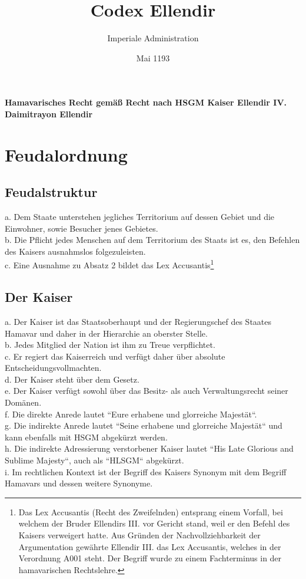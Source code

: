\documentclass{article}
\title{Codex Ellendir}
\author{Imperiale Administration}
\date{Mai 1193}
\begin{document}
\maketitle
\vspace*{\fill}
\paragraph{Hamavarisches Recht gemäß Recht nach HSGM Kaiser Ellendir IV. Daimitrayon Ellendir}

\newpage
\section{Feudalordnung}
\subsection{Feudalstruktur}
a.  Dem Staate unterstehen jegliches Territorium auf dessen Gebiet und die Einwohner, sowie Besucher jenes Gebietes.\\
b. Die Pflicht jedes Menschen auf dem Territorium des Staats ist es, den Befehlen des Kaisers ausnahmslos folgezuleisten.\\
c. Eine Ausnahme zu Absatz 2 bildet das Lex Accusantis\footnote{Das Lex Accusantis (Recht des Zweifelnden) entsprang einem Vorfall, bei welchem der Bruder Ellendirs III. vor Gericht stand, weil er den Befehl des Kaisers verweigert hatte. Aus Gründen der Nachvollziehbarkeit der Argumentation gewährte Ellendir III. das Lex Accusantis, welches in der Verordnung A001 steht. Der Begriff wurde zu einem Fachterminus in der hamavarischen Rechtslehre.}

\subsection{Der Kaiser}
a. Der Kaiser ist das Staatsoberhaupt und der Regierungschef des Staates Hamavar und daher in der Hierarchie an oberster Stelle. \\ 
b. Jedes Mitglied der Nation ist ihm zu Treue verpflichtet.\\
c. Er regiert das Kaiserreich und verfügt daher über absolute Entscheidungsvollmachten.\\
d. Der Kaiser steht über dem Gesetz.\\
e. Der Kaiser verfügt sowohl über das Besitz- als auch Verwaltungsrecht seiner Domänen.\\
f. Die direkte Anrede lautet ``Eure erhabene und glorreiche Majestät``.\\
g. Die indirekte Anrede lautet ``Seine erhabene und glorreiche Majestät`` und kann ebenfalls mit HSGM abgekürzt werden.\\
h. Die indirekte Adressierung verstorbener Kaiser lautet ``His Late Glorious and Sublime Majesty``, auch als ``HLSGM`` abgekürzt.\\
i. Im rechtlichen Kontext ist der Begriff des Kaisers Synonym mit dem Begriff Hamavars und dessen weitere Synonyme.
\end{document}
